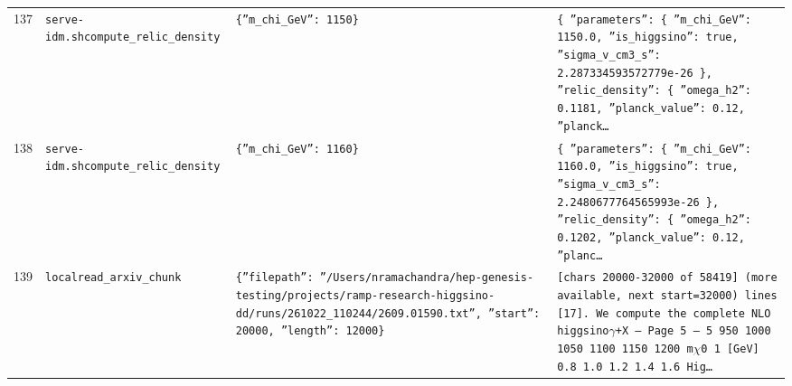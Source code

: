 \documentclass[11pt,a4paper]{article}
\begin{document}
\begin{longtable}{@{}p{}p{}p{}p{}@{}}
137 & \texttt{serve-idm.sh}\newline\texttt{compute\_\allowbreak{}relic\_\allowbreak{}density} & \texttt{\{''m\_\allowbreak{}chi\_\allowbreak{}GeV'':\allowbreak{} 1150\}\allowbreak{}} & \texttt{\{   ''parameters'':\allowbreak{} \{     ''m\_\allowbreak{}chi\_\allowbreak{}GeV'':\allowbreak{} 1150.0,\allowbreak{}     ''is\_\allowbreak{}higgsino'':\allowbreak{} true,\allowbreak{}     ''sigma\_\allowbreak{}v\_\allowbreak{}cm3\_\allowbreak{}s'':\allowbreak{} 2.287334593572779e-26   \}\allowbreak{},\allowbreak{}   ''relic\_\allowbreak{}density'':\allowbreak{} \{     ''omega\_\allowbreak{}h2'':\allowbreak{} 0.1181,\allowbreak{}     ''planck\_\allowbreak{}value'':\allowbreak{} 0.12,\allowbreak{}     ''planck\ldots{}\allowbreak{}} \\
138 & \texttt{serve-idm.sh}\newline\texttt{compute\_\allowbreak{}relic\_\allowbreak{}density} & \texttt{\{''m\_\allowbreak{}chi\_\allowbreak{}GeV'':\allowbreak{} 1160\}\allowbreak{}} & \texttt{\{   ''parameters'':\allowbreak{} \{     ''m\_\allowbreak{}chi\_\allowbreak{}GeV'':\allowbreak{} 1160.0,\allowbreak{}     ''is\_\allowbreak{}higgsino'':\allowbreak{} true,\allowbreak{}     ''sigma\_\allowbreak{}v\_\allowbreak{}cm3\_\allowbreak{}s'':\allowbreak{} 2.2480677764565993e-26   \}\allowbreak{},\allowbreak{}   ''relic\_\allowbreak{}density'':\allowbreak{} \{     ''omega\_\allowbreak{}h2'':\allowbreak{} 0.1202,\allowbreak{}     ''planck\_\allowbreak{}value'':\allowbreak{} 0.12,\allowbreak{}     ''planc\ldots{}\allowbreak{}} \\
139 & \texttt{local}\newline\texttt{read\_\allowbreak{}arxiv\_\allowbreak{}chunk} & \texttt{\{''filepath'':\allowbreak{} ''/\allowbreak{}Users/\allowbreak{}nramachandra/\allowbreak{}hep-genesis-testing/\allowbreak{}projects/\allowbreak{}ramp-research-higgsino-dd/\allowbreak{}runs/\allowbreak{}261022\_\allowbreak{}110244/\allowbreak{}2609.01590.txt'',\allowbreak{} ''start'':\allowbreak{} 20000,\allowbreak{} ''length'':\allowbreak{} 12000\}\allowbreak{}} & \texttt{[chars 20000-32000 of 58419]\allowbreak{} (more available,\allowbreak{} next start=\allowbreak{}32000)\allowbreak{}  lines [17]\allowbreak{}. We compute the complete NLO higgsino$\gamma$+X  --- Page 5 --- 5 950 1000 1050 1100 1150 1200 m$\chi$0 1  [GeV]\allowbreak{} 0.8 1.0 1.2 1.4 1.6 Hig\ldots{}\allowbreak{}} \\

\end{longtable}
\end{document}
